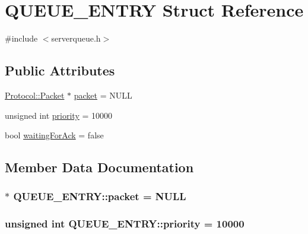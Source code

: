 \hypertarget{struct_q_u_e_u_e___e_n_t_r_y}{}\section{Q\+U\+E\+U\+E\+\_\+\+E\+N\+T\+R\+Y Struct Reference}
\label{struct_q_u_e_u_e___e_n_t_r_y}


{\ttfamily \#include $<$serverqueue.\+h$>$}

\subsection*{Public Attributes}
\begin{DoxyCompactItemize}
\item 
\hyperlink{class_protocol_1_1_packet}{Protocol\+::\+Packet} $\ast$ \hyperlink{struct_q_u_e_u_e___e_n_t_r_y_a9ce6547656475c3c62836a758bf07383}{packet} = N\+U\+L\+L
\item 
unsigned int \hyperlink{struct_q_u_e_u_e___e_n_t_r_y_aceb97e348a3a8237b3af362b56615b01}{priority} = 10000
\item 
bool \hyperlink{struct_q_u_e_u_e___e_n_t_r_y_a881ee0110089a84a651334a82c556795}{waiting\+For\+Ack} = false
\end{DoxyCompactItemize}


\subsection{Member Data Documentation}
\hypertarget{struct_q_u_e_u_e___e_n_t_r_y_a9ce6547656475c3c62836a758bf07383}{}
\subsubsection[{packet}]{$\ast$ Q\+U\+E\+U\+E\+\_\+\+E\+N\+T\+R\+Y\+::packet = N\+U\+L\+L}\label{struct_q_u_e_u_e___e_n_t_r_y_a9ce6547656475c3c62836a758bf07383}
\hypertarget{struct_q_u_e_u_e___e_n_t_r_y_aceb97e348a3a8237b3af362b56615b01}{}
\subsubsection[{priority}]{\setlength{\rightskip}{0pt plus 5cm}unsigned int Q\+U\+E\+U\+E\+\_\+\+E\+N\+T\+R\+Y\+::priority = 10000}\label{struct_q_u_e_u_e___e_n_t_r_y_aceb97e348a3a8237b3af362b56615b01}
\hypertarget{struct_q_u_e_u_e___e_n_t_r_y_a881ee0110089a84a651334a82c556795}{}
